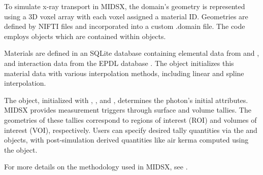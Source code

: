 \par To simulate x-ray transport in MIDSX, the domain's geometry is represented using a 3D voxel array with each voxel assigned a material ID. Geometries are defined by NIFTI files \cite{nifti2004} and incorporated into a custom .domain file. The code employs  objects which are contained within  objects.
\par Materials are defined in an SQLite database \cite{sqlite2020hipp} containing elemental data from \cite{periodictable2022} and \cite{mendeleev2021}, and interaction data from the EPDL database \cite{cullen_survey_nodate}. The  object initializes this material data with various interpolation methods, including linear and spline interpolation.
\par The  object, initialized with , , and , determines the photon's initial attributes. MIDSX provides measurement triggers through surface and volume tallies. The geometries of these tallies correspond to regions of interest (ROI) and volumes of interest (VOI), respectively. Users can specify desired tally quantities via the  and  objects, with post-simulation derived quantities like air kerma computed using the  object.
\par For more details on the methodology used in MIDSX, see \cite{MIDSX2023}.

